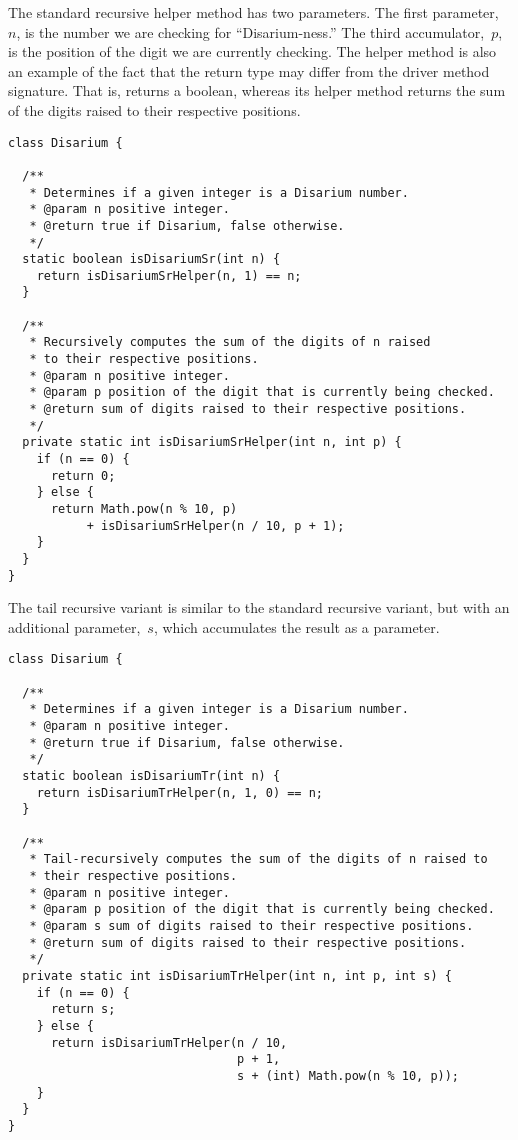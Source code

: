 The standard recursive helper method has two parameters.
The first parameter,~$n$, is the number we are checking for ``Disarium-ness.''
The third accumulator,~$p$, is the position of the digit we are currently checking.
The helper method is also an example of the fact that the return type may differ from the driver method signature.
That is,  returns a boolean, whereas its helper method returns the sum of the digits raised to their respective positions.

\begin{lstlisting}[language=MyJava]
class Disarium {

  /**
   * Determines if a given integer is a Disarium number.
   * @param n positive integer.
   * @return true if Disarium, false otherwise.
   */
  static boolean isDisariumSr(int n) {
    return isDisariumSrHelper(n, 1) == n;
  }

  /**
   * Recursively computes the sum of the digits of n raised 
   * to their respective positions.
   * @param n positive integer.
   * @param p position of the digit that is currently being checked.
   * @return sum of digits raised to their respective positions.
   */
  private static int isDisariumSrHelper(int n, int p) {
    if (n == 0) { 
      return 0;
    } else { 
      return Math.pow(n % 10, p) 
           + isDisariumSrHelper(n / 10, p + 1); 
    }
  }
}
\end{lstlisting}

The tail recursive variant is similar to the standard recursive variant, but with an additional parameter,~$s$, which accumulates the result as a parameter.

\enlargethispage{-2\baselineskip}
\begin{lstlisting}[language=MyJava]
class Disarium {

  /**
   * Determines if a given integer is a Disarium number.
   * @param n positive integer.
   * @return true if Disarium, false otherwise.
   */
  static boolean isDisariumTr(int n) {
    return isDisariumTrHelper(n, 1, 0) == n;
  }

  /**
   * Tail-recursively computes the sum of the digits of n raised to 
   * their respective positions.
   * @param n positive integer.
   * @param p position of the digit that is currently being checked.
   * @param s sum of digits raised to their respective positions.
   * @return sum of digits raised to their respective positions.
   */
  private static int isDisariumTrHelper(int n, int p, int s) {
    if (n == 0) { 
      return s; 
    } else { 
      return isDisariumTrHelper(n / 10, 
                                p + 1, 
                                s + (int) Math.pow(n % 10, p)); 
    }
  }
}
\end{lstlisting}

